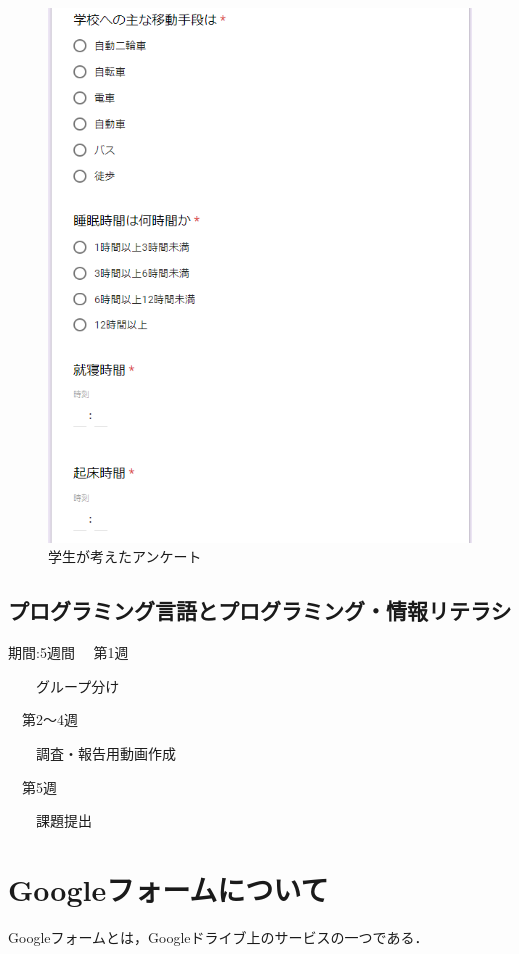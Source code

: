 \newpage
\begin{figure}[thbp]
   \includegraphics[width=13cm]{dma3.png}
   \caption{学生が考えたアンケート}
   \label{M}
\end{figure}
\newpage







\subsection{プログラミング言語とプログラミング・情報リテラシ}

期間:5週間
　第1週

　　グループ分け

　第2～4週

　　調査・報告用動画作成

　第5週

　　課題提出

\newpage

\section{Googleフォームについて}
Googleフォームとは，Googleドライブ上のサービスの一つである．

